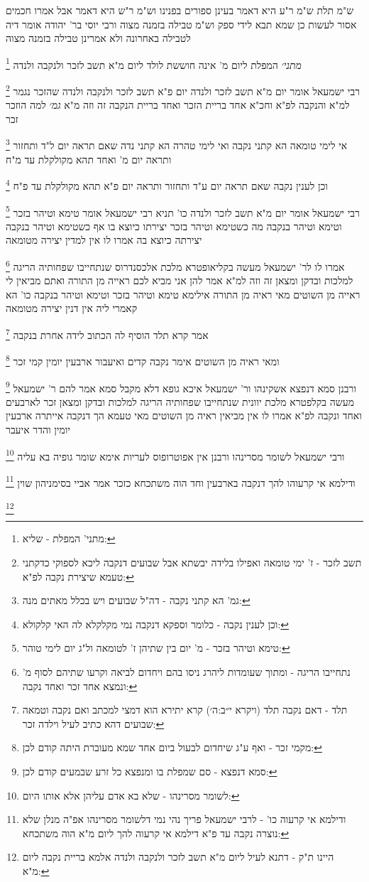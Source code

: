 \documentclass[12pt, openany]{book}
\newcommand{\footnotecomment}[1]{
	\renewcommand\thefootnote{}
	\footnote{#1}}
\newcommand{\commenta}[1]{\footnotecomment{#1}}
\begin{document}
{ש"מ תלת ש"מ ר"ע היא דאמר בעינן ספורים בפנינו 
וש"מ ר"ש היא דאמר אבל אמרו חכמים אסור לעשות כן שמא תבא לידי ספק 
וש"מ טבילה בזמנה מצוה ורבי יוסי בר' יהודה אומר דיה לטבילה באחרונה ולא אמרינן טבילה בזמנה מצוה
\commenta{מתני' המפלת - שליא:}
{\large\emph{מתני׳}} המפלת ליום מ' אינה חוששת לולד ליום מ"א תשב לזכר ולנקבה ולנדה
\commenta{תשב לזכר - ז' ימי טומאה ואפילו בלידה יבשתא אבל שבועים דנקבה ליכא לספוקי כדקתני טעמא שיצירת נקבה לפ"א:}
רבי ישמעאל אומר יום מ"א תשב לזכר ולנדה יום פ"א תשב לזכר ולנקבה ולנדה שהזכר נגמר למ"א והנקבה לפ"א וחכ"א אחד בריית הזכר ואחד בריית הנקבה זה וזה מ"א
{\large\emph{גמ׳}} למה הוזכר זכר
\commenta{גמ' הא קתני נקבה - דה"ל שבועים ויש בכלל מאתים מנה:}
אי לימי טומאה הא קתני נקבה ואי לימי טהרה
הא קתני נדה 
שאם תראה יום ל"ד ותחזור ותראה יום מ' ואחד תהא מקולקלת עד מ"ח 
\commenta{וכן לענין נקבה - כלומר וספקא דנקבה נמי מקלקלא לה האי קלקולא:}
וכן לענין נקבה שאם תראה יום ע"ד ותחזור ותראה יום פ"א תהא מקולקלת עד פ"ח
\commenta{טימא וטיהר בזכר - מ' יום בין שתיהן ז' לטומאה ול"ג יום לימי טוהר:}
רבי ישמעאל אומר יום מ"א תשב לזכר ולנדה כו' תניא רבי ישמעאל אומר טימא וטיהר בזכר וטימא וטיהר בנקבה
מה כשטימא וטיהר בזכר יצירתו כיוצא בו אף כשטימא וטיהר בנקבה יצירתה כיוצא בה אמרו לו אין למדין יצירה מטומאה 
\commenta{נתחייבו הריגה - ומתוך שעומדות ליהרג ניסו בהם ויחדום לביאה וקרעו שתיהם לסוף מ' ונמצא אחד זכר ואחד נקבה:}
אמרו לו לר' ישמעאל מעשה בקליאופטרא מלכת אלכסנדרוס שנתחייבו שפחותיה הריגה למלכות ובדקן ומצאן זה וזה למ"א אמר להן אני מביא לכם ראייה מן התורה ואתם מביאין לי ראייה מן השוטים 
מאי ראיה מן התורה אילימא טימא וטיהר בזכר וטימא וטיהר בנקבה כו' הא קאמרי ליה אין דנין יצירה מטומאה 
\commenta{תלד - דאם נקבה תלד (ויקרא י״ב:ה׳) קרא יתירא הוא דמצי למכתב ואם נקבה וטמאה שבועים דהא כתיב לעיל וילדה זכר:}
אמר קרא תלד הוסיף לה הכתוב לידה אחרת בנקבה 
\commenta{מקמי זכר - ואף ע"ג שיחדום לבעול ביום אחד שמא מעוברת היתה קודם לכן:}
ומאי ראיה מן השוטים אימר נקבה קדים ואיעבור ארבעין יומין קמי זכר 
\commenta{סמא דנפצא - סם שמפלת בו ומנפצא כל זרע שבמעים קודם לכן:}
ורבנן סמא דנפצא אשקינהו ור' ישמעאל איכא גופא דלא מקבל סמא
אמר להם ר' ישמעאל מעשה בקלפטרא מלכת יוונית שנתחייבו שפחותיה הריגה למלכות ובדקן ומצאן זכר לארבעים ואחד ונקבה לפ"א אמרו לו אין מביאין ראיה מן השוטים 
מאי טעמא הך דנקבה אייתרה ארבעין יומין והדר איעבר 
\commenta{לשומר מסרינהו - שלא בא אדם עליהן אלא אותו היום:}
ורבי ישמעאל לשומר מסרינהו ורבנן אין אפוטרופוס לעריות אימא שומר גופיה בא עליה 
\commenta{ודילמא אי קרעוה כו' - לרבי ישמעאל פריך נהי נמי דלשומר מסרינהו אפ"ה מנלן שלא נוצרה נקבה עד פ"א דילמא אי קרעוה להך ליום מ"א הוה משתכחא:}
ודילמא אי קרעוהו להך דנקבה בארבעין וחד הוה משתכחא כזכר אמר אביי בסימניהון שוין
\commenta{היינו ת"ק - דתנא לעיל ליום מ"א תשב לזכר ולנקבה ולנדה אלמא בריית נקבה ליום מ"א:}
}
\end{document}
